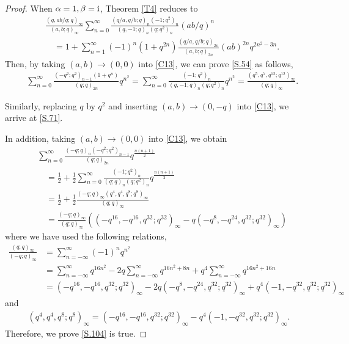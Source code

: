 \documentclass[reqno,12pt]{amsart}
\theoremstyle{remark}
\numberwithin{equation}{section}
\begin{document}
\begin{proof}
When $\alpha=1,\beta={\rm i}$, Theorem \ref{T4} reduces to 
\begin{align}
&\frac{\left(q,ab/q;q\right)_{\infty}}{\left(a,b;q\right)_{\infty}}
\sum_{n=0}^{\infty}\frac{\left(q/a,q/b;q\right)_n\left(-1;q^2\right)_n}
{\left(q,-1;q\right)_{n}\left(q;q^2\right)_{n}}\left(ab/q\right)^n
\nonumber\\
&\quad=1+
\sum_{n=1}^{\infty}\left(-1\right)^n\left(1+q^{2n}\right)\frac{\left(q/a,q/b;q\right)_{2n}}
{\left(a,b;q\right)_{2n}}\left(ab\right)^{2n}q^{2n^2-3n}.\label{C13}
\end{align}
Then,  by taking $\left(a,b\right)\to\left(0,0\right)$ into \eqref{C13}, we can prove \eqref{S.54} as follows,
\begin{align*}
&\sum_{n=0}^{\infty}\frac{\left(-q^2;q^2\right)_{n-1}\left(1+q^n\right)}
{\left(q;q\right)_{2n}}q^{n^2}=
\sum_{n=0}^{\infty}\frac{\left(-1;q^2\right)_n}
{\left(q,-1;q\right)_{n}\left(q;q^2\right)_{n}}q^{n^2}=\frac{\left(q^5,q^7,q^{12};q^{12}\right)_{\infty}}{\left(q;q\right)_{\infty}}.
\end{align*}

Similarly, replacing $q$ by $q^2$ and inserting $\left(a,b\right)\to\left(0,-q\right)$ into \eqref{C13}, we arrive at \eqref{S.71}.

In addition, taking $\left(a,b\right)\to\left(0,0\right)$ into \eqref{C13}, we obtain 
\begin{align*}
&\sum_{n=0}^{\infty}\frac{
\left(-q;q\right)_{n}\left(-q^2;q^2\right)_{n-1}
}{\left(q;q\right)_{2n}}q^{\frac{n\left(n+1\right)}{2}}\\
&\quad
=
\frac{1}{2}+\frac{1}{2}\sum_{n=0}^{\infty}\frac{\left(-1;q^2\right)_n}
{\left(q;q\right)_n\left(q;q^2\right)_n}q^{\frac{n\left(n+1\right)}{2}}\\
&\quad=\frac{1}{2}+\frac{1}{2}\frac{\left(-q;q\right)_{\infty}\left(q^4,q^4,q^8;q^8\right)_{\infty}}{\left(q;q\right)_{\infty}}\\
&\quad=\frac{\left(-q;q\right)_{\infty}}
{\left(q;q\right)_{\infty}}\left(\left(-q^{16},-q^{16},q^{32};q^{32}\right)_{\infty}
-q\left(-q^{8},-q^{24},q^{32};q^{32}\right)_{\infty}\right)
\end{align*}
where we have used the following relations,
\begin{align*}
\frac{\left(q;q\right)_{\infty}}{\left(-q;q\right)_{\infty}}
&=\sum_{n=-\infty}^{\infty}\left(-1\right)^nq^{n^2}\\
&=\sum_{n=-\infty}^{\infty}q^{16n^2}
-2q\sum_{n=-\infty}^{\infty}q^{16n^2+8n}+q^4
\sum_{n=-\infty}^{\infty}q^{16n^2+16n}
\\
&=\left(-q^{16},-q^{16},q^{32};q^{32}\right)_{\infty}
-2q\left(-q^{8},-q^{24},q^{32};q^{32}\right)_{\infty}
+q^4\left(-1,-q^{32},q^{32};q^{32}\right)_{\infty}
\end{align*}
and
\begin{align*}
\left(q^4,q^4,q^8;q^8\right)_{\infty}=\left(-q^{16},-q^{16},q^{32};q^{32}\right)_{\infty}
-q^4\left(-1,-q^{32},q^{32};q^{32}\right)_{\infty}.
\end{align*}
Therefore, we prove \eqref{S.104} is true.
\end{proof}
\end{document}
